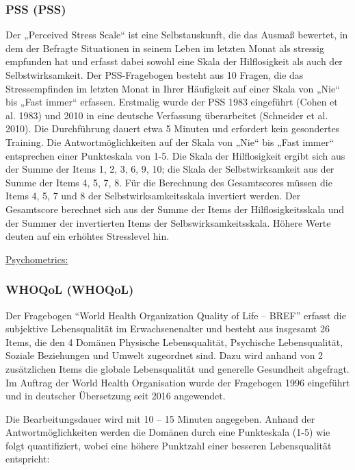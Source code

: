 \subsubsection{\acl{PSS} (\acs{PSS})}
\label{questionnaires:PSS}
Der „Perceived Stress Scale“ ist eine Selbstauskunft, die das Ausmaß bewertet, in dem der Befragte Situationen in seinem Leben im letzten Monat als stressig empfunden hat und erfasst dabei sowohl eine Skala der Hilflosigkeit als auch der Selbstwirksamkeit. Der PSS-Fragebogen besteht aus 10 Fragen, die das Stressempfinden im letzten Monat in Ihrer Häufigkeit auf einer Skala von „Nie“ bis „Fast immer“ erfassen. Erstmalig wurde der PSS 1983 eingeführt (Cohen et al. 1983) und 2010 in eine deutsche Verfassung überarbeitet (Schneider et al. 2010). 
Die Durchführung dauert etwa 5 Minuten und erfordert kein gesondertes Training. Die Antwortmöglichkeiten auf der Skala von „Nie“ bis „Fast immer“ entsprechen einer Punkteskala von 1-5. Die Skala der Hilflosigkeit ergibt sich aus der Summe der Items 1, 2, 3, 6, 9, 10; die Skala der Selbstwirksamkeit aus der Summe der Items 4, 5, 7, 8. Für die Berechnung des Gesamtscores müssen die Items 4, 5, 7 und 8 der Selbstwirksamkeitsskala invertiert werden. Der Gesamtscore berechnet sich aus der Summe der Items der Hilflosigkeitsskala und der Summer der invertierten Items der Selbswirksamkeitsskala. Höhere Werte deuten auf ein erhöhtes Stresslevel hin.

\underline{Psychometrics:}

\subsubsection{\acl{WHOQoL} (\acs{WHOQoL})}
\label{questionnaires:WHOQoL}

Der Fragebogen “World Health Organization Quality of Life – BREF” erfasst die subjektive Lebensqualität im Erwachsenenalter und besteht aus insgesamt 26 Items, die den 4 Domänen Physische Lebensqualität, Psychische Lebensqualität, Soziale Beziehungen und Umwelt zugeordnet sind. Dazu wird anhand von 2 zusätzlichen Items die globale Lebensqualität und generelle Gesundheit abgefragt. Im Auftrag der World Health Organisation wurde der Fragebogen 1996 eingeführt und in deutscher Übersetzung seit 2016 angewendet.

Die Bearbeitungsdauer wird mit 10 – 15 Minuten angegeben. Anhand der Antwortmöglichkeiten werden die Domänen durch eine Punkteskala (1-5) wie folgt quantifiziert, wobei eine höhere Punktzahl einer besseren Lebensqualität entspricht:

